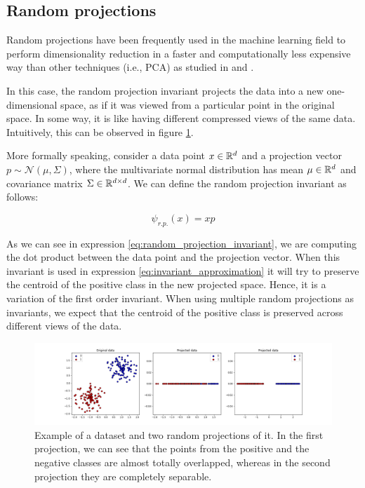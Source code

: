 \subsection{Random projections}

Random projections have been frequently used in the machine learning field to perform dimensionality reduction
in a faster and computationally less expensive way than other techniques (i.e., PCA) as studied in 
\cite{Dasgupta2000} and \cite{BinghamManila2001}.

In this case, the random projection invariant projects the data into a new one-dimensional space,
as if it was viewed from a particular point in the original space. In some way, it is like having
different compressed views of the same data. Intuitively, this can be observed in figure
\ref{fig:random_projections_example}.

More formally speaking, consider a data point $x \in \mathbb{R}^{d}$ and a projection vector
$p \sim \mathcal{N}(\mu, \Sigma)$, where the multivariate normal distribution has mean $\mu \in \mathbb{R}^{d}$
and covariance matrix $\Sigma \in \mathbb{R}^{d \times d}$. We can define the random projection invariant as follows:

\begin{equation}
    \label{eq:random_projection_invariant}
    \psi_{r.p.}(x) = x p
\end{equation}

As we can see in expression \eqref{eq:random_projection_invariant}, we are computing the dot product between
the data point and the projection vector. When this invariant is used in expression \ref{eq:invariant_approximation}
it will try to preserve the centroid of the positive class in the new projected space. Hence, it is a variation
of the first order invariant. When using multiple random projections as invariants, we expect that the centroid
of the positive class is preserved across different views of the data.

\begin{figure}[h]
    \centering
    \includegraphics[width=\textwidth]{thesis/Figures/random_projections_example}
    \caption{Example of a dataset and two random projections of it. In the first projection, we can see
    that the points from the positive and the negative classes are almost totally overlapped, whereas in the
    second projection they are completely separable.}
    \label{fig:random_projections_example}
\end{figure}

